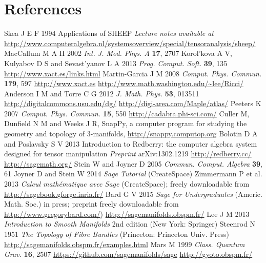 \documentclass[a4paper]{jpconf}
\begin{document}
\section*{References}
\begin{thebibliography}{10}
Skea J E F 1994 Applications of SHEEP {\it Lecture notes available at}
\url{
http://www.computeralgebra.nl/systemsoverview/special/tensoranalysis/sheep/}
MacCallum M A H 2002 {\it Int. J. Mod. Phys. A} {\bf 17}, 2707 
Korol'kova A V, Kulyabov D S and Sevast'yanov L A 2013 {\it Prog. Comput. Soft.} 
{\bf 39}, 135
\url{http://www.xact.es/links.html}
Martin-Garcia J M 2008 {\it Comput. Phys. Commun.} {\bf 179}, 597
\url{http://www.xact.es}
\url{http://www.math.washington.edu/~lee/Ricci/}
Anderson I M and Torre C G 2012 {\it J. Math. Phys.} {\bf 53}, 013511
\url{http://digitalcommons.usu.edu/dg/}
\url{http://digi-area.com/Maple/atlas/}
Peeters K 2007 {\it Comput. Phys. Commun.} {\bf 15}, 550
\url{http://cadabra.phi-sci.com/}
Culler M, Dunfield N M and Weeks J R, SnapPy, a computer program for studying the geometry and topology of 3-manifolds, \url{http://snappy.computop.org}
Bolotin D A and Poslavsky S V 2013 Introduction to Redberry: the computer algebra system designed for tensor manipulation {\it Preprint} arXiv:1302.1219
\url{http://redberry.cc/}
\url{http://sagemath.org/}
Stein W and Joyner D 2005 {\it Commun. Comput. Algebra} {\bf 39}, 61
Joyner D and Stein W 2014 {\it Sage Tutorial} (CreateSpace)
Zimmermann P et al. 2013 {\it Calcul math\'ematique avec Sage} (CreateSpace); 
freely downloadable from \url{http://sagebook.gforge.inria.fr/}
Bard G V 2015 {\it Sage for Undergraduates} (Americ. Math. Soc.) in press;
preprint freely downloadable from \url{http://www.gregorybard.com/})
\url{http://sagemanifolds.obspm.fr/}
Lee J M 2013 {\it Introduction to Smooth Manifolds} 2nd edition (New York: Springer)
Steenrod N 1951 {\it The Topology of Fibre Bundles} (Princeton: Princeton Univ. Press)
\url{http://sagemanifolds.obspm.fr/examples.html}
Mars M 1999 {\it Class. Quantum Grav.} {\bf 16}, 2507
\url{https://github.com/sagemanifolds/sage}
\url{http://gyoto.obspm.fr/}
\end{thebibliography}
\end{document}
